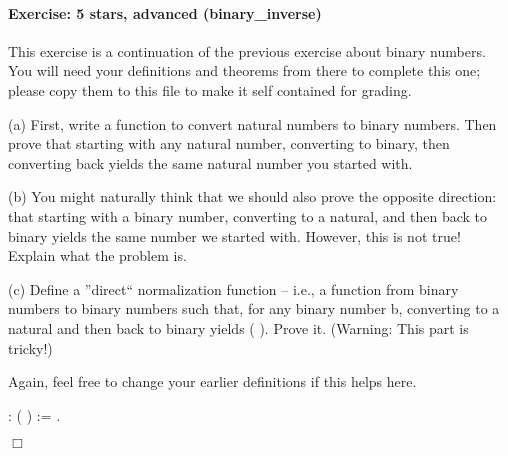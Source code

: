 \documentclass[12pt]{report}
\begin{document}
\paragraph{Exercise: 5 stars, advanced (binary\_inverse)}

 This exercise is a continuation of the previous exercise about
    binary numbers.  You will need your definitions and theorems from
    there to complete this one; please copy them to this file to make
    it self contained for grading.


    (a) First, write a function to convert natural numbers to binary
        numbers.  Then prove that starting with any natural number,
        converting to binary, then converting back yields the same
        natural number you started with.


    (b) You might naturally think that we should also prove the
        opposite direction: that starting with a binary number,
        converting to a natural, and then back to binary yields the
        same number we started with.  However, this is not true!
        Explain what the problem is.


    (c) Define a ''direct`` normalization function -- i.e., a function
         from binary numbers to binary numbers such that,
        for any binary number b, converting to a natural and then back
        to binary yields ( ).  Prove it.  (Warning: This
        part is tricky!)


    Again, feel free to change your earlier definitions if this helps
    here. \begin{coqdoccode}
\coqdocemptyline
\coqdocemptyline
\coqdocnoindent
{}  :  (  ) := .\coqdoceol
\end{coqdoccode}
\ensuremath{\Box} \begin{coqdoccode}
\coqdocemptyline
\end{coqdoccode}
\end{document}
